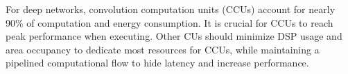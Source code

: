 For deep networks, convolution computation units (CCUs) account for nearly 90\% of computation and energy consumption. It is crucial for CCUs to reach peak performance when executing. Other CUs should minimize DSP usage and area occupancy to dedicate most resources for CCUs, while maintaining a pipelined computational flow to hide latency and increase performance.
